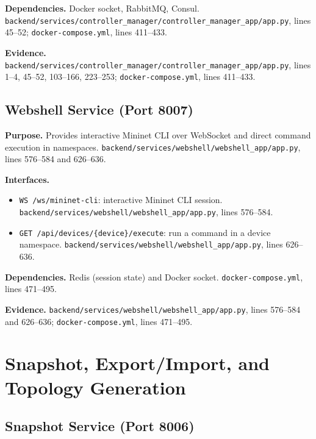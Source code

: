 \documentclass[10pt,a4paper]{article}
\begin{document}
\textbf{Dependencies.} Docker socket, RabbitMQ, Consul. \texttt{backend/services/controller\_manager/controller\_manager\_app/app.py}, lines 45--52; \texttt{docker-compose.yml}, lines 411--433.

\textbf{Evidence.} \texttt{backend/services/controller\_manager/controller\_manager\_app/app.py}, lines 1--4, 45--52, 103--166, 223--253; \texttt{docker-compose.yml}, lines 411--433.

\subsection{Webshell Service (Port 8007)}

\textbf{Purpose.} Provides interactive Mininet CLI over WebSocket and direct command execution in namespaces. \texttt{backend/services/webshell/webshell\_app/app.py}, lines 576--584 and 626--636.

\textbf{Interfaces.}
\begin{itemize}[leftmargin=*]
\item \texttt{WS /ws/mininet-cli}: interactive Mininet CLI session. \texttt{backend/services/webshell/webshell\_app/app.py}, lines 576--584.
\item \texttt{GET /api/devices/\{device\}/execute}: run a command in a device namespace. \texttt{backend/services/webshell/webshell\_app/app.py}, lines 626--636.
\end{itemize}

\textbf{Dependencies.} Redis (session state) and Docker socket. \texttt{docker-compose.yml}, lines 471--495.

\textbf{Evidence.} \texttt{backend/services/webshell/webshell\_app/app.py}, lines 576--584 and 626--636; \texttt{docker-compose.yml}, lines 471--495.

\section{Snapshot, Export/Import, and Topology Generation}

\subsection{Snapshot Service (Port 8006)}
\end{document}

